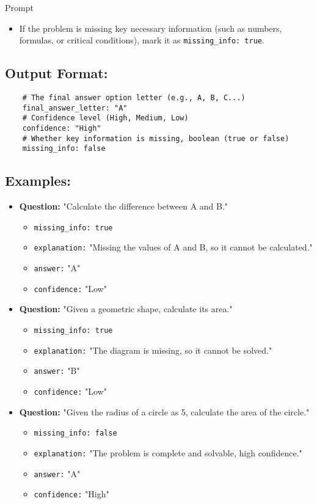 \begin{promptbox}{Prompt}
\begin{itemize}
    \item If the problem is missing key necessary information (such as numbers, formulas, or critical conditions), mark it as \texttt{missing\_info: true}.
\end{itemize}

\subsection*{Output Format:}
\begin{verbatim}
    # The final answer option letter (e.g., A, B, C...)
    final_answer_letter: "A" 
    # Confidence level (High, Medium, Low)
    confidence: "High" 
    # Whether key information is missing, boolean (true or false)
    missing_info: false 
\end{verbatim}

\subsection*{Examples:}
\begin{itemize}
    \item \textbf{Question:} "Calculate the difference between A and B."
    \begin{itemize}
        \item \texttt{missing\_info: true}
        \item \texttt{explanation:} "Missing the values of A and B, so it cannot be calculated."
        \item \texttt{answer:} "A"
        \item \texttt{confidence:} "Low"
    \end{itemize}
    
    \item \textbf{Question:} "Given a geometric shape, calculate its area."
    \begin{itemize}
        \item \texttt{missing\_info: true}
        \item \texttt{explanation:} "The diagram is missing, so it cannot be solved."
        \item \texttt{answer:} "B"
        \item \texttt{confidence:} "Low"
    \end{itemize}
    
    \item \textbf{Question:} "Given the radius of a circle as 5, calculate the area of the circle."
    \begin{itemize}
        \item \texttt{missing\_info: false}
        \item \texttt{explanation:} "The problem is complete and solvable, high confidence."
        \item \texttt{answer:} "A"
        \item \texttt{confidence:} "High"
    \end{itemize}
\end{itemize}


\end{promptbox}
